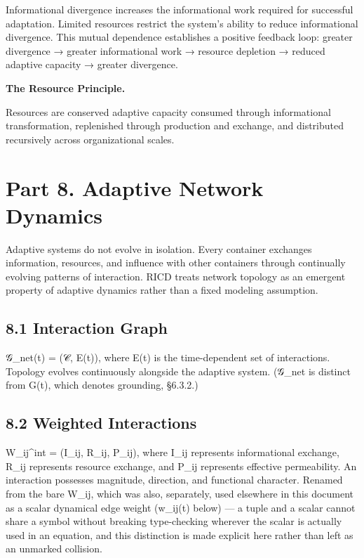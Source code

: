 \documentclass[
]{article}
\begin{document}
Informational divergence increases the informational work required for
successful adaptation. Limited resources restrict the system's ability
to reduce informational divergence. This mutual dependence establishes a
positive feedback loop: greater divergence → greater informational work
→ resource depletion → reduced adaptive capacity → greater divergence.

\textbf{The Resource Principle.}

Resources are conserved adaptive capacity consumed through informational
transformation, replenished through production and exchange, and
distributed recursively across organizational scales.

\hypertarget{part-8.-adaptive-network-dynamics}{%
\section{Part 8. Adaptive Network
Dynamics}\label{part-8.-adaptive-network-dynamics}}

Adaptive systems do not evolve in isolation. Every container exchanges
information, resources, and influence with other containers through
continually evolving patterns of interaction. RICD treats network
topology as an emergent property of adaptive dynamics rather than a
fixed modeling assumption.

\hypertarget{interaction-graph}{%
\subsection{8.1 Interaction Graph}\label{interaction-graph}}

𝒢\_net(t) = (𝒞, E(t)), where E(t) is the time-dependent set of
interactions. Topology evolves continuously alongside the adaptive
system. (𝒢\_net is distinct from G(t), which denotes grounding, §6.3.2.)

\hypertarget{weighted-interactions}{%
\subsection{8.2 Weighted Interactions}\label{weighted-interactions}}

W\_ij\^{}int = (I\_ij, R\_ij, P\_ij), where I\_ij represents
informational exchange, R\_ij represents resource exchange, and P\_ij
represents effective permeability. An interaction possesses magnitude,
direction, and functional character. Renamed from the bare W\_ij, which
was also, separately, used elsewhere in this document as a scalar
dynamical edge weight (w\_ij(t) below) --- a tuple and a scalar cannot
share a symbol without breaking type-checking wherever the scalar is
actually used in an equation, and this distinction is made explicit here
rather than left as an unmarked collision.
\end{document}
